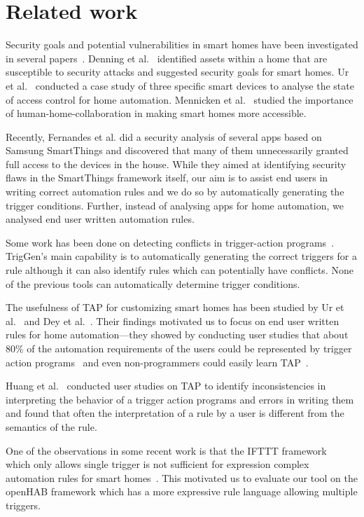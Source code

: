 \documentclass{sig-alternate-05-2015}
\begin{document}
\section{Related work}
Security goals and potential vulnerabilities in smart homes have been investigated in several papers~\cite{yoshi, dhanjani, jung, todayToTomorrow}. Denning et al.~\cite{yoshi} identified assets within a home that are susceptible to security attacks and suggested security goals for smart homes. Ur et al.~\cite{jung} conducted a case study of three specific smart devices to analyse the state of access control for home automation. Mennicken et al.~\cite{todayToTomorrow} studied the importance of human-home-collaboration in making smart homes more accessible.

Recently, Fernandes et al.\cite{smartthings16} did a security analysis of several apps based on Samsung SmartThings and discovered that many of them unnecessarily granted full access to the devices in the house. While they aimed at identifying security flaws in the SmartThings framework itself, our aim is to assist end users in writing correct automation rules and we do so by automatically generating the trigger conditions.  Further, instead of analysing apps for home automation, we analysed end user written automation rules.

Some work has been done on detecting conflicts in trigger-action programs~\cite{rvs, homer, utea, Nakamura05featureinteractions}. TrigGen's main capability is to automatically generating the correct triggers for a rule although it can also identify rules which can potentially have conflicts. None of the previous tools can automatically determine trigger conditions.

The usefulness of TAP for customizing smart homes has been studied by Ur et al.~\cite{practical-tap} and Dey et al.~\cite{dey}. Their findings motivated us to focus on end user written rules for home automation---they showed by conducting user studies that about 80\% of the automation requirements of the users could be represented by trigger action programs~\cite{dey} and even non-programmers could easily learn TAP~\cite{practical-tap}.

Huang et al.~\cite{Huang} conducted user studies on TAP to identify inconsistencies in interpreting the behavior of a trigger action programs and errors in writing them and found that often the interpretation of a rule by a user is different from the semantics of the rule. 

One of the observations in some recent work is that the IFTTT framework~\cite{iftttframework} which only allows single trigger is not sufficient for expression complex automation rules for smart homes~\cite{Huang, practical-tap}. This motivated us to evaluate our tool on the openHAB framework which has a more expressive rule language allowing multiple triggers. 
\end{document}

